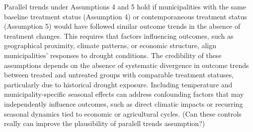 Parallel trends under Assumptions 4 and 5 hold if municipalities with the same baseline treatment status (Assumption 4) or contemporaneous treatment status (Assumption 5) would have followed similar outcome trends in the absence of treatment changes. This requires that factors influencing outcomes, such as geographical proximity, climate patterns, or economic structure, align municipalities’ responses to drought conditions. The credibility of these assumptions depends on the absence of systematic divergence in outcome trends between treated and untreated groups with comparable treatment statuses, particularly due to historical drought exposure. Including temperature and municipality-specific seasonal effects can address confounding factors that may independently influence outcomes, such as direct climatic impacts or recurring seasonal dynamics tied to economic or agricultural cycles. (Can these controls really can improve the plausibility of paralell trends assumption?)
